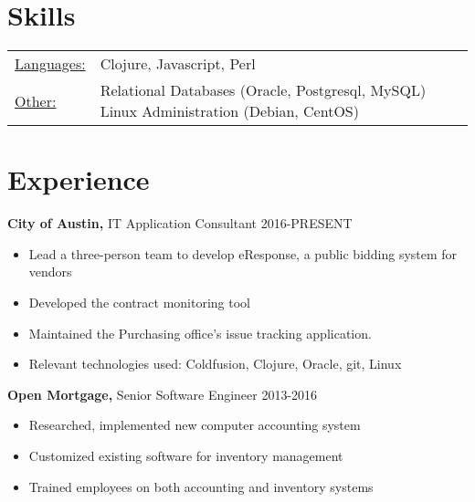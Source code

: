 \documentclass[margin]{res}
\begin{document}

\address{2025 E 7th St \#227 \\ Austin, TX 78702  \\
        (512) 785-5214}
\address{https://shadgregory.net \\ https://github.com/shadgregory/office \\
  http://www.vim.org/scripts/script.php?script id=155}

\begin{resume}

\section{Skills}
   \begin{tabular}{l p{3in}}
    \underline{Languages:} & Clojure, Javascript, Perl \\

    \underline{Other:} &  Relational Databases (Oracle, Postgresql, MySQL)
    Linux Administration (Debian, CentOS)
   \end{tabular}

\section{Experience}
 {\bf City of Austin,} IT Application Consultant \hfill 2016-PRESENT
 \begin{itemize} \itemsep -2pt  %
 \item Lead a three-person team to develop eResponse, a public bidding system for vendors
 \item Developed the contract monitoring tool
 \item Maintained the Purchasing office’s issue tracking application.
 \item Relevant technologies used: Coldfusion, Clojure, Oracle, git, Linux
 \end{itemize}

{\bf Open Mortgage,} Senior Software Engineer \hfill  2013-2016
\begin{itemize} \itemsep -2pt %
\item Researched, implemented new computer accounting
                 system
\item Customized existing software for inventory
                 management
\item Trained employees on both accounting and inventory
                 systems
\end{itemize}


\end{resume}
\end{document}
